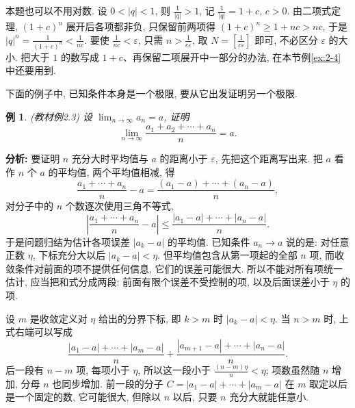 \documentclass[UTF8,openany]{ctexbook}
\theoremstyle{chinesetextbook}
\newtheorem{example}{例}[section]
\begin{document}
本题也可以不用对数. 设 $0<|q|<1$, 则 $\displaystyle\frac1{|q|}>1$, 记 $\displaystyle\frac1{|q|}=1+c$, $c>0$. 由二项式定理, $(1+c)^n$ 展开后各项都非负, 只保留前两项得 $(1+c)^n\ge1+nc>nc$, 于是 $\displaystyle|q|^n=\frac1{(1+c)^n}<\frac1{nc}$. 要使 $\displaystyle\frac1{nc}<\varepsilon$, 只需 $\displaystyle n>\frac1{c\varepsilon}$, 取 $\displaystyle N=\left[\frac1{c\varepsilon}\right]$ 即可, 不必区分 $\varepsilon$ 的大小. 把大于 $1$ 的数写成 $1+c$、再保留二项展开中一部分的办法, 在本节例\ref{ex:2-4} 中还要用到.

下面的例子中, 已知条件本身是一个极限, 要从它出发证明另一个极限.
\begin{example}
\textnormal{(教材例2.3)} 设 $\displaystyle\lim_{n\to\infty}a_n=a$, 证明
\[
\lim_{n\to\infty}\frac{a_1+a_2+\cdots+a_n}n=a.
\]
\end{example}
\par\indent\textbf{分析:} 要证明 $n$ 充分大时平均值与 $a$ 的距离小于 $\varepsilon$, 先把这个距离写出来. 把 $a$ 看作 $n$ 个 $a$ 的平均值, 两个平均值相减, 得
\[
\frac{a_1+\cdots+a_n}n-a=\frac{(a_1-a)+\cdots+(a_n-a)}n,
\]
对分子中的 $n$ 个数逐次使用三角不等式,
\[
\left|\frac{a_1+\cdots+a_n}n-a\right|\le\frac{|a_1-a|+\cdots+|a_n-a|}n.
\]
于是问题归结为估计各项误差 $|a_k-a|$ 的平均值. 已知条件 $a_n\to a$ 说的是: 对任意正数 $\eta$, 下标充分大以后 $|a_k-a|<\eta$. 但平均值包含从第一项起的全部 $n$ 项, 而收敛条件对前面的项不提供任何信息, 它们的误差可能很大. 所以不能对所有项统一估计, 应当把和式分成两段: 前面有限个误差不受控制的项, 以及后面误差小于 $\eta$ 的项.

设 $m$ 是收敛定义对 $\eta$ 给出的分界下标, 即 $k>m$ 时 $|a_k-a|<\eta$. 当 $n>m$ 时, 上式右端可以写成
\[
\frac{|a_1-a|+\cdots+|a_m-a|}n+\frac{|a_{m+1}-a|+\cdots+|a_n-a|}n.
\]
后一段有 $n-m$ 项, 每项小于 $\eta$, 所以这一段小于 $\displaystyle\frac{(n-m)\eta}n<\eta$; 项数虽然随 $n$ 增加, 分母 $n$ 也同步增加. 前一段的分子 $C=|a_1-a|+\cdots+|a_m-a|$ 在 $m$ 取定以后是一个固定的数, 它可能很大, 但除以 $n$ 以后, 只要 $n$ 充分大就能任意小.
\end{document}
